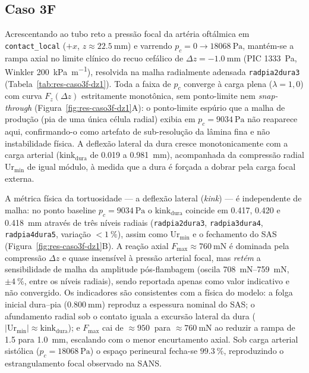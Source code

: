 \documentclass[12pt,a4paper]{article}
\begin{document}
\subsection*{Caso 3F}
\label{sec:res-caso3f}

Acrescentando ao tubo reto a pressão focal da artéria oftálmica em \texttt{contact\_local} ($+x$, $z \approx \SI{22.5}{\milli\meter}$) e varrendo $p_c = 0 \to \SI{18068}{\pascal}$, mantém-se a rampa axial no limite clínico do recuo cefálico de $\Delta z = -\SI{1.0}{\milli\meter}$ (PIC \SI{1333}{\pascal}, Winkler \SI{200}{\kilo\pascal\per\meter}), resolvida na malha radialmente adensada \texttt{radpia2dura3} (Tabela~\ref{tab:res-caso3f-dz1}). Toda a faixa de $p_c$ converge à carga plena ($\lambda = 1{,}0$) com curva $F_z(\Delta z)$ estritamente monotônica, sem ponto-limite nem \emph{snap-through} (Figura~\ref{fig:res-caso3f-dz1}A): o ponto-limite espúrio que a malha de produção (pia de uma única célula radial) exibia em $p_c = \SI{9034}{\pascal}$ não reaparece aqui, confirmando-o como artefato de sub-resolução da lâmina fina e não instabilidade física. A deflexão lateral da dura cresce monotonicamente com a carga arterial ($\mathrm{kink}_{\mathrm{dura}}$ de \SI{0.019}{} a \SI{0.981}{\milli\meter}), acompanhada da compressão radial $\mathrm{Ur}_{\min}$ de igual módulo, à medida que a dura é forçada a dobrar pela carga focal externa.

A métrica física da tortuosidade --- a deflexão lateral (\emph{kink}) --- é independente de malha: no ponto baseline $p_c = \SI{9034}{\pascal}$ o $\mathrm{kink}_{\mathrm{dura}}$ coincide em \SI{0.417}{}, \SI{0.420}{} e \SI{0.418}{\milli\meter} através de três níveis radiais (\texttt{radpia2dura3}, \texttt{radpia3dura4}, \texttt{radpia4dura5}, variação $< \SI{1}{\%}$), assim como $\mathrm{Ur}_{\min}$ e o fechamento do SAS (Figura~\ref{fig:res-caso3f-dz1}B). A reação axial $F_{\max} \approx \SI{760}{\milli\newton}$ é dominada pela compressão $\Delta z$ e quase insensível à pressão arterial focal, mas \emph{retém} a sensibilidade de malha da amplitude pós-flambagem (oscila \SIrange{708}{759}{\milli\newton}, $\pm\SI{4}{\%}$, entre os níveis radiais), sendo reportada apenas como valor indicativo e não convergido. Os indicadores são consistentes com a física do modelo: a folga inicial dura--pia ($\SI{0.800}{\milli\meter}$) reproduz a espessura nominal do SAS; o afundamento radial sob o contato iguala a excursão lateral da dura ($|\mathrm{Ur}_{\min}| \approx \mathrm{kink}_{\mathrm{dura}}$); e $F_{\max}$ cai de $\approx \SI{950}{}$ para $\approx \SI{760}{\milli\newton}$ ao reduzir a rampa de \SI{1.5}{} para \SI{1.0}{\milli\meter}, escalando com o menor encurtamento axial. Sob carga arterial sistólica ($p_c = \SI{18068}{\pascal}$) o espaço perineural fecha-se $\SI{99.3}{\%}$, reproduzindo o estrangulamento focal observado na SANS.
\end{document}
